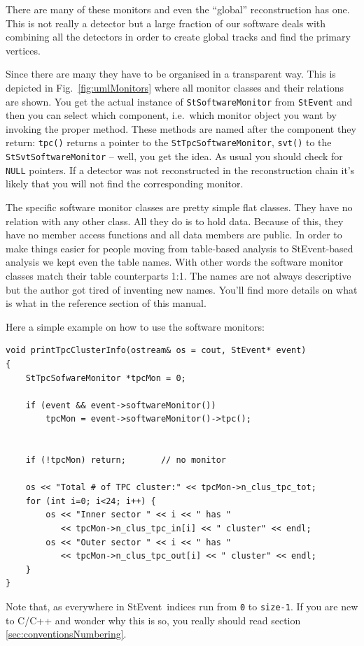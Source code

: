 \documentclass[twoside]{article}
\newcommand{\StEvent}{\textsf{StEvent}}
\begin{document}
There are many of these monitors and even the ``global''
reconstruction has one. This is not really a detector but a large
fraction of our software deals with combining all the detectors in
order to create global tracks and find the primary vertices.

Since there are many they have to be organised in a transparent way.
This is depicted in Fig.~\ref{fig:umlMonitors} where all monitor
classes and their relations are shown.  You get the actual instance of
\texttt{StSoftwareMonitor} from \texttt{StEvent} and then you can
select which component, i.e.~which monitor object you want by invoking
the proper method. These methods are named after the component they
return: \texttt{tpc()} returns a pointer to the
\texttt{StTpcSoftwareMonitor}, \texttt{svt()} to the
\texttt{StSvtSoftwareMonitor} -- well, you get the idea. As usual you
should check for \texttt{NULL} pointers. If a detector was not
reconstructed in the reconstruction chain it's likely that you will
not find the corresponding monitor.

The specific software monitor classes are pretty simple flat classes.
They have no relation with any other class. All they do is to hold
data. Because of this, they have no member access functions and all
data members are public. In order to make things easier for people
moving from table-based analysis to \StEvent-based analysis we kept
even the table names.  With other words the software monitor classes
match their table counterparts 1:1.  The names are not always
descriptive but the author got tired of inventing new names.  You'll
find more details on what is what in the reference section of this
manual.

Here a simple example on how to use the software monitors:
\begin{verbatim}
void printTpcClusterInfo(ostream& os = cout, StEvent* event)
{
    StTpcSofwareMonitor *tpcMon = 0;

    if (event && event->softwareMonitor())
        tpcMon = event->softwareMonitor()->tpc();


    if (!tpcMon) return;       // no monitor

    os << "Total # of TPC cluster:" << tpcMon->n_clus_tpc_tot;
    for (int i=0; i<24; i++) {
        os << "Inner sector " << i << " has "
           << tpcMon->n_clus_tpc_in[i] << " cluster" << endl;
        os << "Outer sector " << i << " has "
           << tpcMon->n_clus_tpc_out[i] << " cluster" << endl;
    }
}
\end{verbatim}
Note that, as everywhere in \StEvent\ indices run from \texttt{0} to
\texttt{size-1}.  If you are new to C/C++ and wonder why this is so,
you really should read section \ref{sec:conventionsNumbering}.\vfill
\end{document}
